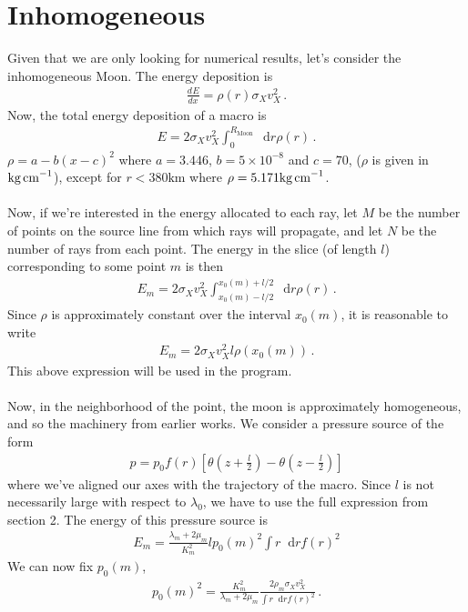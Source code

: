 \documentclass{article}
\newcommand*\diff{\mathop{}\!\mathrm{d}}
\newcommand*\te[1]{\text{#1}}
\newcommand*\p[1]{\left(#1\right)}
\newcommand*\ps[1]{\left[#1\right]}
\newcommand*\f[2]{\frac{#1}{#2}}
\newcommand*\td[3]{\frac{d^{#3}#1}{d #2^{#3}}}
\begin{document}
\section{Inhomogeneous}
Given that we are only looking for numerical results, let's consider the inhomogeneous Moon. The energy deposition is
\begin{align}
\td{E}{x}{} = \rho(r)\sigma_X v_X^2\,.
\end{align}
Now, the total energy deposition of a macro is
\begin{align}
E =2\sigma_X v_X^2 \int_0^{R_{\te{Moon}}}\diff r\rho(r)\,.
\end{align}
$\rho = a-b(x-c)^2$ where $a=3.446$, $b = 5\times 10^{-8}$ and $c = 70$, ($\rho$ is given in $\te{kg\,cm}^{-1}$), except for $r<380\te{km}$ where $\rho =5.171\te{kg\,cm}^{-1}$.
\\\\
Now, if we're interested in the energy allocated to each ray, let $M$ be the number of points on the source line from which rays will propagate, and let $N$ be the number of rays from each point. The energy in the slice (of length $l$) corresponding to some point $m$ is then
\begin{align}
E_m = 2\sigma_X v_X^2\int_{x_0(m)- l/2}^{x_0(m) + l/2}\diff r\rho(r)\,.
\end{align}
Since $\rho$ is approximately constant over the interval $x_0(m)$, it is reasonable to write
\begin{align}
E_m = 2\sigma_Xv_X^2 l\rho(x_0(m))\,.
\end{align}
This above expression will be used in the program.
\\\\
Now, in the neighborhood of the point, the moon is approximately homogeneous, and so the machinery from earlier works. We consider a pressure source of the form
\begin{align}
p=p_0f(r)\ps{\theta\p{z+\f l2}-\theta\p{z-\f l2}}
\end{align}
where we've aligned our axes with the trajectory of the macro. Since $l$ is not necessarily large with respect to $\lambda_0$, we have to use the full expression from section 2. The energy of this pressure source is
\begin{align}
E_m = \f{\lambda_m + 2\mu_m}{K_m^2} l p_0(m)^2\int r\diff r f(r)^2
\end{align}
We can now fix $p_0(m)$,
\begin{align}
p_0(m)^2 = \f{ K_m^2}{\lambda_m + 2\mu_m}\f{2\rho_m\sigma_Xv_X^2}{\int r\diff r f(r)^2}\,.
\end{align}
\end{document}
